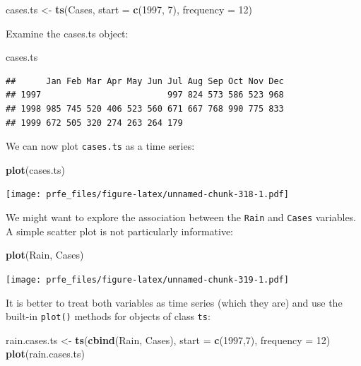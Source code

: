 \documentclass[12pt,a4paper]{book}
\newenvironment{Shaded}{\begin{snugshade}}{\end{snugshade}}
\newcommand{\KeywordTok}[1]{\textcolor[rgb]{0.13,0.29,0.53}{\textbf{#1}}}
\newcommand{\DataTypeTok}[1]{\textcolor[rgb]{0.13,0.29,0.53}{#1}}
\newcommand{\DecValTok}[1]{\textcolor[rgb]{0.00,0.00,0.81}{#1}}
\newcommand{\StringTok}[1]{\textcolor[rgb]{0.31,0.60,0.02}{#1}}
\newcommand{\NormalTok}[1]{#1}
\theoremstyle{definition}
\theoremstyle{definition}
\theoremstyle{definition}
\theoremstyle{remark}
\begin{document}
\begin{Shaded}
\begin{Highlighting}[]
\NormalTok{cases.ts <-}\StringTok{ }\KeywordTok{ts}\NormalTok{(Cases, }\DataTypeTok{start =} \KeywordTok{c}\NormalTok{(}\DecValTok{1997}\NormalTok{, }\DecValTok{7}\NormalTok{), }\DataTypeTok{frequency =} \DecValTok{12}\NormalTok{)}
\end{Highlighting}
\end{Shaded}

Examine the cases.ts object:

\begin{Shaded}
\begin{Highlighting}[]
\NormalTok{cases.ts}
\end{Highlighting}
\end{Shaded}

\begin{verbatim}
##      Jan Feb Mar Apr May Jun Jul Aug Sep Oct Nov Dec
## 1997                         997 824 573 586 523 968
## 1998 985 745 520 406 523 560 671 667 768 990 775 833
## 1999 672 505 320 274 263 264 179
\end{verbatim}

We can now plot \texttt{cases.ts} as a time series:

\begin{Shaded}
\begin{Highlighting}[]
\KeywordTok{plot}\NormalTok{(cases.ts)}
\end{Highlighting}
\end{Shaded}

\texttt{[image: prfe\_files/figure-latex/unnamed-chunk-318-1.pdf]}

We might want to explore the association between the \texttt{Rain} and
\texttt{Cases} variables. A simple scatter plot is not particularly
informative:

\begin{Shaded}
\begin{Highlighting}[]
\KeywordTok{plot}\NormalTok{(Rain, Cases)}
\end{Highlighting}
\end{Shaded}

\texttt{[image: prfe\_files/figure-latex/unnamed-chunk-319-1.pdf]}

It is better to treat both variables as time series (which they are) and
use the built-in \texttt{plot()} methods for objects of class
\texttt{ts}:

\begin{Shaded}
\begin{Highlighting}[]
\NormalTok{rain.cases.ts <-}\StringTok{ }\KeywordTok{ts}\NormalTok{(}\KeywordTok{cbind}\NormalTok{(Rain, Cases), }\DataTypeTok{start =} \KeywordTok{c}\NormalTok{(}\DecValTok{1997}\NormalTok{,}\DecValTok{7}\NormalTok{), }\DataTypeTok{frequency =} \DecValTok{12}\NormalTok{)}
\KeywordTok{plot}\NormalTok{(rain.cases.ts)}
\end{Highlighting}
\end{Shaded}
\end{document}

